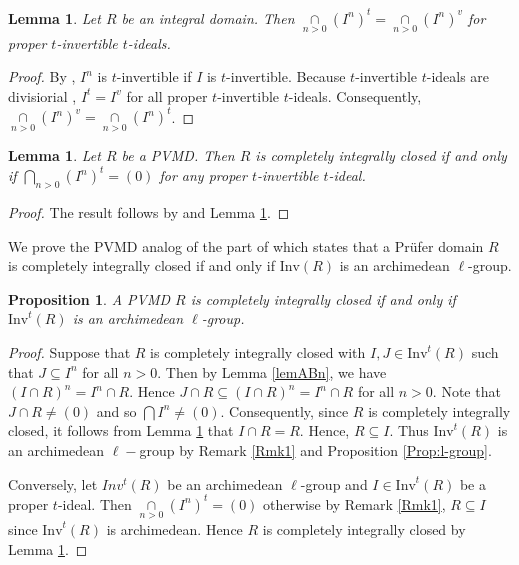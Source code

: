 \documentclass[12pt]{amsart}
\newtheorem{lemma}[theorem]{Lemma}
\newtheorem{proposition}[theorem]{Proposition}
\theoremstyle{definition}\newtheorem{remark}[theorem]{Remark}
\theoremstyle{definition}\newtheorem{definition}[theorem]{Definition}
\begin{document}
\begin{lemma}\label{Lemmat-v}
Let $R$ be an integral domain. Then
$\mathop{\cap}\limits_{n>0}(I^n)^t= \mathop{\cap}\limits_{n>0}(I^n)^v$ for proper $t$-invertible $t$-ideals. 
\end{lemma}

\begin{proof}
    By \cite[Proposition 1.2]{Zafrullah2000}, $I^n$ is $t$-invertible if $I$ is $t$-invertible. Because $t$-invertible $t$-ideals are divisiorial \cite[Theorem 1.1]{Zafrullah2000}, $I^t=I^v$ for all proper $t$-invertible $t$-ideals. 
    Consequently, $\mathop{\cap}\limits_{n>0}(I^n)^v = \mathop{\cap}\limits_{n>0}(I^n)^t$. 
\end{proof}





\begin{lemma}\label{Intersection}
    Let $R$ be a PVMD. Then $R$  is completely integrally closed if and only if $\bigcap\limits_{n>0}(I^n)^t=(0)$ for any proper $t$-invertible $t$-ideal.
\end{lemma}
\begin{proof}
The result follows by \cite[Theorem 1.2]{Anderson2017} and Lemma \ref{Lemmat-v}. 
\end{proof}
We prove the PVMD analog of the part of \cite[Proposition 3.1]{ICPrufer} which states that a Pr\"{u}fer domain $R$ is completely integrally closed if and only if $\text{Inv}(R)$ is an archimedean $\ell$-group.
\begin{proposition}\label{CIC-ALG}
A PVMD $R$ is completely integrally closed if and only
if $\text{Inv}^t(R)$ is an archimedean $\ell$-group. 
\end{proposition}

\begin{proof}
Suppose that $R$ is completely integrally closed with $I,J \in \text{Inv}^t(R)$ such that $J \subseteq I^n$
for all $n>0$. Then by Lemma \ref{lemABn}, we have $(I \cap R)^n = I^n \cap R $. Hence $J \cap R \subseteq (I \cap R)^n = I^n \cap R$
for all $n>0$. 
Note that $J\cap R\neq (0)$ and so $\bigcap I^n \neq (0)$. 
Consequently, since $R$ is completely
integrally closed, it follows from Lemma \ref{Intersection} that $I\cap R=R$. Hence, $R\subseteq I$. Thus
$\text{Inv}^t(R)$ is an archimedean $\ell-$group by Remark \ref{Rmk1} and Proposition \ref{Prop:l-group}. 

Conversely, let $Inv^t(R)$ be an archimedean $\ell$-group and $I\in \text{Inv}^t(R)$ be a proper $t$-ideal. Then $\mathop{\cap}\limits_{n>0}(I^n)^t=(0)$ otherwise by Remark \ref{Rmk1}, $R\subseteq I$ since $\text{Inv}^t(R)$ is archimedean. 
Hence $R$ is completely
integrally closed by Lemma \ref{Intersection}. 
\end{proof}
\end{document}
